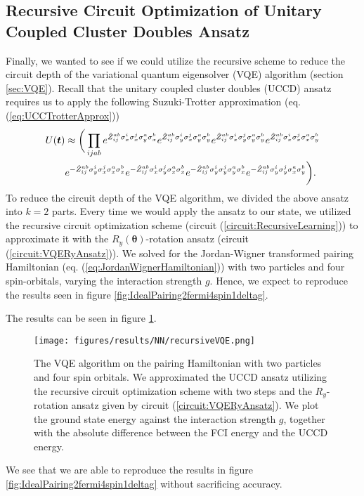 \subsection{Recursive Circuit Optimization of Unitary Coupled Cluster Doubles Ansatz}
Finally, we wanted to see if we could utilize the recursive scheme to reduce the circuit depth of the variational quantum eigensolver (VQE) algorithm (section \ref{sec:VQE}). Recall that the unitary coupled cluster doubles (UCCD) ansatz requires us to apply the following Suzuki-Trotter approximation (eq. (\ref{eq:UCCTrotterApprox}))
\begin{align*}
    U(\boldsymbol{t}) &\approx  \bigg( \prod_{ijab} e^{\hat{Z}_{ij}^{ab}\sigma_x^i \sigma_x^j \sigma_y^a \sigma_x^b }
    e^{\hat{Z}_{ij}^{ab}\sigma_y^i \sigma_x^j \sigma_y^a \sigma_y^b }
    e^{\hat{Z}_{ij}^{ab}\sigma_x^i\sigma_y^j \sigma_y^a \sigma_y^b }
    e^{\hat{Z}_{ij}^{ab}\sigma_x^i \sigma_x^j \sigma_x^a \sigma_y^b } \notag \\
    &e^{-\hat{Z}_{ij}^{ab}\sigma_y^i \sigma_x^j \sigma_x^a \sigma_x^b }
    e^{-\hat{Z}_{ij}^{ab}\sigma_x^i \sigma_y^j \sigma_x^a \sigma_x^b }
    e^{-\hat{Z}_{ij}^{ab}\sigma_y^i \sigma_y^j \sigma_y^a \sigma_x^b }
    e^{-\hat{Z}_{ij}^{ab}\sigma_y^i \sigma_y^j \sigma_x^a \sigma_y^b }
    \bigg).
\end{align*}
To reduce the circuit depth of the VQE algorithm, we divided the above ansatz into $k=2$ parts. Every time we would apply the ansatz to our state, we utilized the recursive circuit optimization scheme (circuit (\ref{circuit:RecursiveLearning})) to approximate it with the $R_y(\boldsymbol{\theta})$-rotation ansatz (circuit (\ref{circuit:VQERyAnsatz})). We solved for the Jordan-Wigner transformed pairing Hamiltonian (eq. (\ref{eq:JordanWignerHamiltonian})) with two particles and four spin-orbitals, varying the interaction strength $g$. Hence, we expect to reproduce the results seen in figure \ref{fig:IdealPairing2fermi4spin1deltag}. 

The results can be seen in figure \ref{fig:recursiveVQE}.
\begin{figure}[H]
    \centering
    \texttt{[image: figures/results/NN/recursiveVQE.png]}
    \caption{The VQE algorithm on the pairing Hamiltonian with two particles and four spin orbitals. We approximated the UCCD ansatz utilizing the recursive circuit optimization scheme with two steps and the $R_y$-rotation ansatz given by circuit (\ref{circuit:VQERyAnsatz}). We plot the ground state energy against the interaction strength $g$, together with the absolute difference between the FCI energy and the UCCD energy.}
    \label{fig:recursiveVQE}
\end{figure}
We see that we are able to reproduce the results in figure \ref{fig:IdealPairing2fermi4spin1deltag} without sacrificing accuracy.

